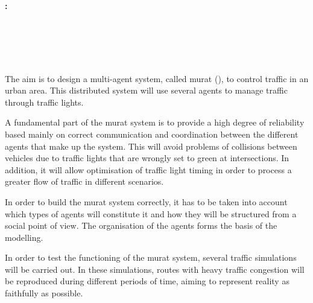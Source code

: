 \cleardoublepage

\chapter*{}

\thispagestyle{empty}

\begin{center}
    {\large\bfseries \myTitleShort: \myTitle}\\
\end{center}

\begin{center}
    \myName\\
\end{center}

\\

    \vspace{0.7cm}

\\

The aim is to design a multi-agent system, called \acrshort{murat} (\myTitle), to control traffic in an urban area. This distributed system will use several agents to manage traffic through traffic lights.

A fundamental part of the \acrshort{murat} system is to provide a high degree of reliability based mainly on correct communication and coordination between the different agents that make up the system. This will avoid problems of collisions between vehicles due to traffic lights that are wrongly set to green at intersections. In addition, it will allow optimisation of traffic light timing in order to process a greater flow of traffic in different scenarios. 

In order to build the \acrshort{murat} system correctly, it has to be taken into account which types of agents will constitute it and how they will be structured from a social point of view. The organisation of the agents forms the basis of the modelling.

In order to test the functioning of the \acrshort{murat} system,  several traffic simulations will be carried out. In these simulations, routes with heavy traffic congestion will be reproduced during different periods of time, aiming to represent reality as faithfully as possible.
